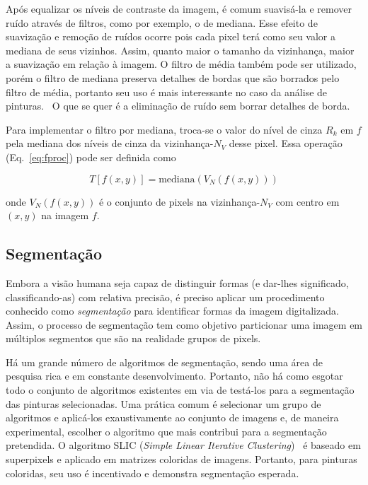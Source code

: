 Após equalizar os níveis de contraste da imagem, é comum suavisá-la e
remover ruído através de filtros, como por exemplo, o de mediana. Esse
efeito de suavização e remoção de ruídos ocorre pois cada pixel terá
como seu valor a mediana de seus vizinhos. Assim, quanto maior o
tamanho da vizinhança, maior a suavização em relação à imagem. O
filtro de média também pode ser utilizado, porém o filtro de mediana
preserva detalhes de bordas que são borrados pelo filtro de média,
portanto seu uso é mais interessante no caso da análise de
pinturas.~\cite{gonzalez} O que se quer é a eliminação de ruído sem
borrar detalhes de borda.

Para implementar o filtro por mediana, troca-se o valor do nível de
cinza $R_k$ em $f$ pela mediana dos níveis de cinza da
vizinhança-$N_V$ desse pixel. Essa operação (Eq.~\ref{eq:fproc}) pode
ser definida como

\begin{equation}
  T[f(x,y)] = \text{mediana}(V_N(f(x,y)))
\end{equation}

\noindent onde $V_N(f(x,y))$ é o conjunto de pixels na
vizinhança-$N_V$ com centro em $(x,y)$ na imagem $f$.

\subsection{Segmentação}
\label{sec:slic}

Embora a visão humana seja capaz de distinguir formas (e dar-lhes
significado, classificando-as) com relativa precisão, é preciso
aplicar um procedimento conhecido como \emph{segmentação} para
identificar formas da imagem digitalizada. Assim, o processo de
segmentação tem como objetivo particionar uma imagem em múltiplos
segmentos que são na realidade grupos de pixels.

Há um grande número de algoritmos de segmentação, sendo uma área de
pesquisa rica e em constante desenvolvimento. Portanto, não há como
esgotar todo o conjunto de algoritmos existentes em via de testá-los
para a segmentação das pinturas selecionadas. Uma prática comum é
selecionar um grupo de algoritmos e aplicá-los exaustivamente ao
conjunto de imagens e, de maneira experimental, escolher o algoritmo
que mais contribui para a segmentação pretendida. O algoritmo SLIC
(\textit{Simple Linear Iterative Clustering})~\cite{slic} é baseado em
superpixels e aplicado em matrizes coloridas de imagens. Portanto,
para pinturas coloridas, seu uso é incentivado e demonstra segmentação
esperada.

